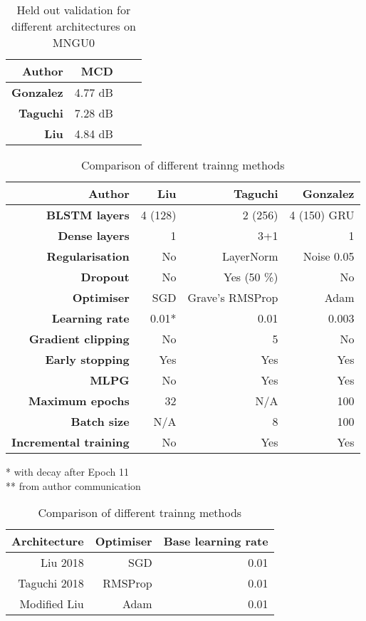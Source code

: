 \documentclass[a4paper]{article}
\begin{document}
\begin{table}[th]
  \caption{Held out validation for different architectures on MNGU0}
  \label{tab:pilot}
  \centering
  \footnotesize

  \begin{tabular}{ r r r r }
    \toprule
    \textbf{Author} & \textbf{MCD} \\
    \midrule
    \textbf{Gonzalez} & 4.77 dB \\
    \textbf{Taguchi} & 7.28 dB \\
    \textbf{Liu} & 4.84 dB \\
    \bottomrule
  \end{tabular}
\end{table}

\begin{table}[th]
  \caption{Comparison of different trainng methods}
  \label{tab:architectures}
  \centering
  \footnotesize

  \begin{tabular}{ r r r r }
    \toprule
    \textbf{Author} & \textbf{Liu} & \textbf{Taguchi} & \textbf{Gonzalez} \\
    \midrule
    \textbf{BLSTM layers} & 4 (128) & 2 (256) & 4 (150) GRU \\
    \textbf{Dense layers} & 1 & 3+1 & 1 \\
    \textbf{Regularisation} & No & LayerNorm & Noise 0.05 \\
    \textbf{Dropout} & No & Yes (50 \%) & No \\
    \textbf{Optimiser} & SGD & Grave's RMSProp & Adam \\
    \textbf{Learning rate} & 0.01* & 0.01 & 0.003 \\
    \textbf{Gradient clipping} & No & 5 & No \\
    \textbf{Early stopping} & Yes & Yes & Yes \\
    \textbf{MLPG} & No & Yes & Yes \\ 
    \textbf{Maximum epochs} & 32 & N/A & 100 \\
    \textbf{Batch size} & N/A & 8 & 100 \\
    \textbf{Incremental training} & No & Yes & Yes \\
    \bottomrule
  \end{tabular}
  * with decay after Epoch 11 \\
  ** from author communication
\end{table}
\begin{table}[th]
  \caption{Comparison of different trainng methods}
  \label{tab:example}
  \centering
  \begin{tabular}{ r r r }
    \toprule
    \textbf{Architecture} & \textbf{Optimiser} & \textbf{Base learning rate} \\
    \midrule
    Liu 2018 & SGD & 0.01 \\
    Taguchi 2018 & RMSProp & 0.01       \\
    Modified Liu & Adam & 0.01               \\
    \bottomrule
  \end{tabular}
  
\end{table}
\end{document}
